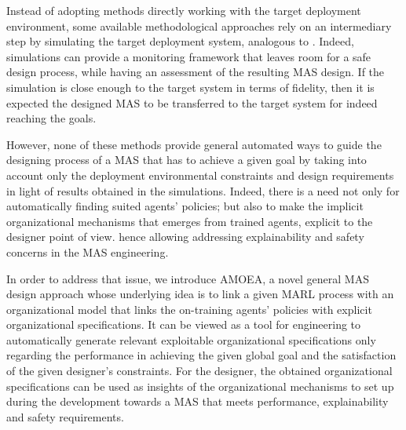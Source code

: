 \documentclass[runningheads]{llncs}
\begin{document}

Instead of adopting methods directly working with the target deployment environment, some available methodological approaches rely on an intermediary step by simulating the target deployment system, analogous to . Indeed, simulations can provide a monitoring framework that leaves room for a safe design process, while having an assessment of the resulting MAS design. If the simulation is close enough to the target system in terms of fidelity, then it is expected the designed MAS to be transferred to the target system for indeed reaching the goals.

However, none of these methods provide general automated ways to guide the designing process of a MAS that has to achieve a given goal by taking into account only the deployment environmental constraints and design requirements in light of results obtained in the simulations. Indeed, there is a need not only for automatically finding suited agents' policies; but also to make the implicit organizational mechanisms that emerges from trained agents, explicit to the designer point of view. hence allowing addressing explainability and safety concerns in the MAS engineering.


In order to address that issue, we introduce AMOEA, a novel general MAS design approach whose underlying idea is to link a given MARL process with an organizational model that links the on-training agents' policies with explicit organizational specifications. It can be viewed as a tool for engineering to automatically generate relevant exploitable organizational specifications only regarding the performance in achieving the given global goal and the satisfaction of the given designer's constraints. For the designer, the obtained organizational specifications can be used as insights of the organizational mechanisms to set up during the development towards a MAS that meets performance, explainability and safety requirements.


\end{document}
